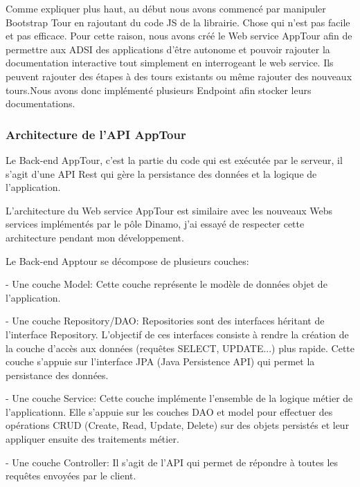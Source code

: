 \documentclass[12pt]{article}
\begin{document}
Comme expliquer plus haut, au début nous avons commencé par manipuler Bootstrap Tour en rajoutant du code JS de la librairie. Chose qui n'est pas facile et pas efficace. Pour cette raison, nous avons créé le Web service AppTour afin de permettre aux ADSI des applications d'être autonome et pouvoir rajouter la documentation interactive tout simplement en interrogeant le web service. Ils peuvent rajouter des étapes à des tours existants ou même rajouter des nouveaux tours.Nous avons donc implémenté plusieurs Endpoint afin stocker leurs documentations.  
 
\subsubsection{Architecture de l'API AppTour}

Le Back-end AppTour, c’est la partie du code qui est exécutée par le serveur, il s'agit d'une API Rest qui gère la persistance des données et la logique de l'application. 

L'architecture du Web service AppTour est similaire avec les nouveaux Webs services implémentés par le pôle Dinamo, j'ai essayé de respecter cette architecture pendant mon développement. 

Le Back-end Apptour se décompose de plusieurs couches: \newline

- Une couche Model: Cette couche représente le modèle de données objet de l'application. \newline

- Une couche Repository/DAO: Repositories sont des interfaces héritant de l'interface Repository. L'objectif de ces interfaces consiste à rendre la création de la couche d'accès aux données (requêtes SELECT, UPDATE...) plus rapide. Cette couche s'appuie sur l'interface JPA (Java Persistence API) qui permet la persistance des données.\newline


- Une couche Service: Cette couche implémente l'ensemble de la logique métier de l'applicationn. Elle s'appuie sur les couches DAO et model pour effectuer des opérations CRUD (Create, Read, Update, Delete) sur des objets persistés et leur appliquer ensuite des traitements métier.\newline


- Une couche Controller: Il s'agit de l'API qui permet de répondre à toutes les requêtes envoyées par le client. 
\end{document}
